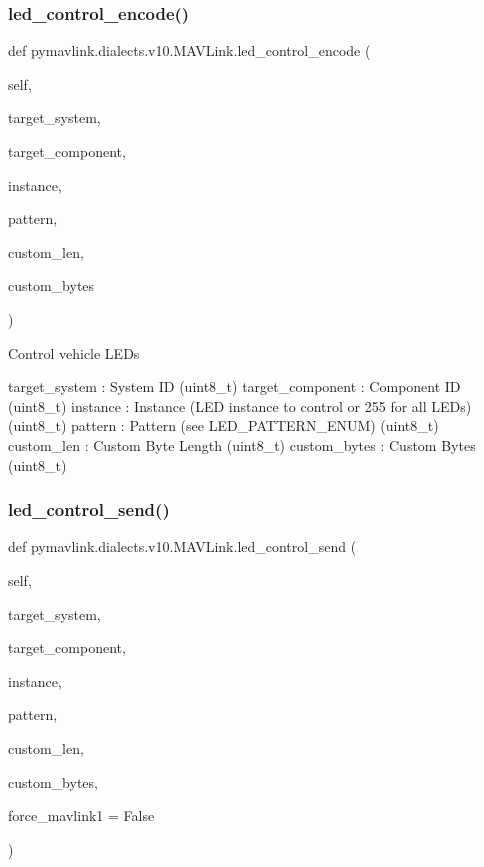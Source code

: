 \begin{DoxyVerb}
\begin{DoxyVerb}
\begin{DoxyVerb}
\begin{DoxyVerb}
\subsubsection{\texorpdfstring{led\+\_\+control\+\_\+encode()}{led\_control\_encode()}}
{\footnotesize\ttfamily def pymavlink.\+dialects.\+v10.\+M\+A\+V\+Link.\+led\+\_\+control\+\_\+encode (\begin{DoxyParamCaption}\item[{}]{self,  }\item[{}]{target\+\_\+system,  }\item[{}]{target\+\_\+component,  }\item[{}]{instance,  }\item[{}]{pattern,  }\item[{}]{custom\+\_\+len,  }\item[{}]{custom\+\_\+bytes }\end{DoxyParamCaption})}

\begin{DoxyVerb}Control vehicle LEDs

target_system             : System ID (uint8_t)
target_component          : Component ID (uint8_t)
instance                  : Instance (LED instance to control or 255 for all LEDs) (uint8_t)
pattern                   : Pattern (see LED_PATTERN_ENUM) (uint8_t)
custom_len                : Custom Byte Length (uint8_t)
custom_bytes              : Custom Bytes (uint8_t)\end{DoxyVerb}
 \mbox{\label{classpymavlink_1_1dialects_1_1v10_1_1MAVLink_aa357ce4b63e163c469bdeda40ecb217f}} 
\subsubsection{\texorpdfstring{led\+\_\+control\+\_\+send()}{led\_control\_send()}}
{\footnotesize\ttfamily def pymavlink.\+dialects.\+v10.\+M\+A\+V\+Link.\+led\+\_\+control\+\_\+send (\begin{DoxyParamCaption}\item[{}]{self,  }\item[{}]{target\+\_\+system,  }\item[{}]{target\+\_\+component,  }\item[{}]{instance,  }\item[{}]{pattern,  }\item[{}]{custom\+\_\+len,  }\item[{}]{custom\+\_\+bytes,  }\item[{}]{force\+\_\+mavlink1 = {\ttfamily False} }\end{DoxyParamCaption})}


\end{DoxyVerb}
\end{DoxyVerb}
\end{DoxyVerb}
\end{DoxyVerb}

